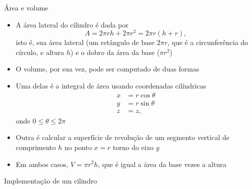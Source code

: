 \begin{frame}[fragile]{Área e volume}

    \begin{itemize}
        \item A área lateral do cilindro é dada por 
        \[
            A = 2\pi rh + 2\pi r^2 = 2\pi r(h + r),
        \]
        isto é, sua área lateral (um retângulo de base $2\pi r$, que é a circunferência
            do círculo, e altura $h$) e o dobro da área da base ($\pi r^2$)
        \pause

        \item O volume, por sua vez, pode ser computado de duas formas
        \pause

        \item Uma delas é a integral de área usando coordenadas cilíndricas 
        \begin{align*}
            x &= r\cos \theta\\
            y &= r\sin \theta\\
            z &= z,
        \end{align*}
        onde $0 \leq \theta \leq 2\pi$
        \pause

        \item Outra é calcular a superfície de revolução de um segmento vertical de comprimento
            $h$ no ponto $x = r$ torno do eixo $y$
        \pause

        \item Em ambos casos, $V = \pi r^2 h$, que é igual a área da base vezes a altura

    \end{itemize}

\end{frame}

\begin{frame}[fragile]{Implementação de um cilindro}
\end{frame}
